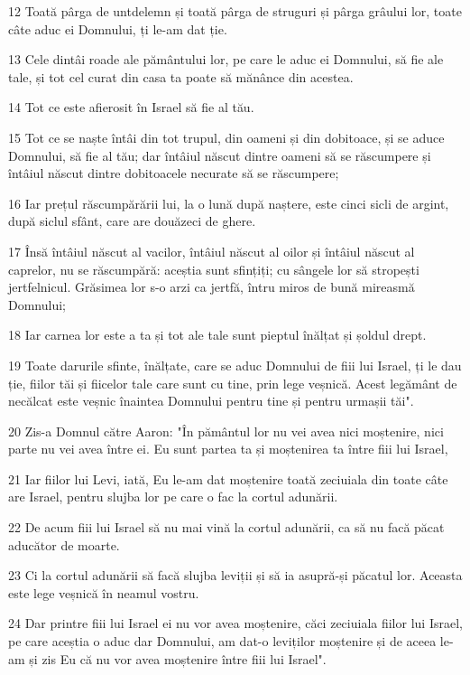 \par 12 Toată pârga de untdelemn și toată pârga de struguri și pârga grâului lor, toate câte aduc ei Domnului, ți le-am dat ție.
\par 13 Cele dintâi roade ale pământului lor, pe care le aduc ei Domnului, să fie ale tale, și tot cel curat din casa ta poate să mănânce din acestea.
\par 14 Tot ce este afierosit în Israel să fie al tău.
\par 15 Tot ce se naște întâi din tot trupul, din oameni și din dobitoace, și se aduce Domnului, să fie al tău; dar întâiul născut dintre oameni să se răscumpere și întâiul născut dintre dobitoacele necurate să se răscumpere;
\par 16 Iar prețul răscumpărării lui, la o lună după naștere, este cinci sicli de argint, după siclul sfânt, care are douăzeci de ghere.
\par 17 Însă întâiul născut al vacilor, întâiul născut al oilor și întâiul născut al caprelor, nu se răscumpără: aceștia sunt sfințiți; cu sângele lor să stropești jertfelnicul. Grăsimea lor s-o arzi ca jertfă, întru miros de bună mireasmă Domnului;
\par 18 Iar carnea lor este a ta și tot ale tale sunt pieptul înălțat și șoldul drept.
\par 19 Toate darurile sfinte, înălțate, care se aduc Domnului de fiii lui Israel, ți le dau ție, fiilor tăi și fiicelor tale care sunt cu tine, prin lege veșnică. Acest legământ de necălcat este veșnic înaintea Domnului pentru tine și pentru urmașii tăi".
\par 20 Zis-a Domnul către Aaron: "În pământul lor nu vei avea nici moștenire, nici parte nu vei avea între ei. Eu sunt partea ta și moștenirea ta între fiii lui Israel,
\par 21 Iar fiilor lui Levi, iată, Eu le-am dat moștenire toată zeciuiala din toate câte are Israel, pentru slujba lor pe care o fac la cortul adunării.
\par 22 De acum fiii lui Israel să nu mai vină la cortul adunării, ca să nu facă păcat aducător de moarte.
\par 23 Ci la cortul adunării să facă slujba leviții și să ia asupră-și păcatul lor. Aceasta este lege veșnică în neamul vostru.
\par 24 Dar printre fiii lui Israel ei nu vor avea moștenire, căci zeciuiala fiilor lui Israel, pe care aceștia o aduc dar Domnului, am dat-o leviților moștenire și de aceea le-am și zis Eu că nu vor avea moștenire între fiii lui Israel".
